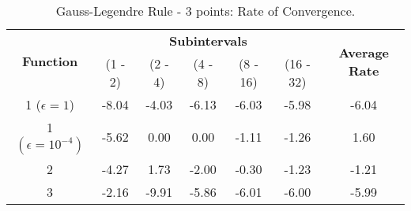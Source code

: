 \begin{table}[H]
    \centering
    \caption{Gauss-Legendre Rule - 3 points: Rate of Convergence.}
    \label{tab:gauss3_rate}
    \begin{tabular}{ccccccc}
        \hline
        \multirow{2}{*}{\textbf{Function}} & \multicolumn{5}{c}{\textbf{Subintervals}} & \multicolumn{1}{c}{\multirow{2}{*}{\textbf{Average Rate}}} \\ \cline{2-6}
 & (1 - 2) & (2 - 4) & (4 - 8) & (8 - 16) & (16 - 32) & \multicolumn{1}{c}{} \\ \hline
        \makecell{1 \\ ($\epsilon = 1$)} & -8.04 & -4.03 & -6.13 & -6.03 & -5.98 & -6.04 \\
        \makecell{1 \\ $\left(\epsilon = 10^{-4}\right)$} & -5.62 & 0.00 & 0.00 & -1.11 & -1.26 & 1.60 \\
        2 & -4.27 & 1.73 & -2.00 & -0.30 & -1.23 & -1.21 \\ 
        3 & -2.16 & -9.91 & -5.86 & -6.01 & -6.00 & -5.99 \\ \hline
    \end{tabular}
\end{table}

